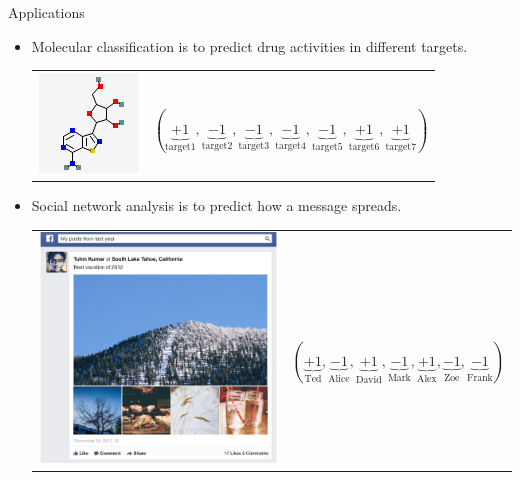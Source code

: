 \documentclass[first=purple,second=dgreen,logo=redexc]{aaltoslides}
\begin{document}
{\begin{frame}{Applications}
\begin{itemize}
\begin{tabular}{p{3cm}p{10cm}}
		& $(\underbrace{+1}_{\text{news}},\underbrace{+1}_{\text{economics}},\underbrace{-1}_{\text{sports}},\underbrace{-1}_{\text{politics}},\underbrace{-1}_{\text{movie}},\underbrace{-1}_{\text{science}},\underbrace{-1}_{\text{art}})$\\
        \end{tabular}
		\item Molecular classification is to predict drug activities in different targets.\\
		\begin{tabular}{p{3cm}p{10cm}} 
        \multirow{2}{*}{\includegraphics[scale = 0.4]{./figures/mol1.png}} & \\
		& $(\underbrace{+1}_{\text{target1}},\underbrace{-1}_{\text{target2}},\underbrace{-1}_{\text{target3}},\underbrace{-1}_{\text{target4}},\underbrace{-1}_{\text{target5}},\underbrace{+1}_{\text{target6}},\underbrace{+1}_{\text{target7}})$\\
        \end{tabular}
		\item Social network analysis is to predict how a message spreads.
		\begin{tabular}{p{3cm}p{10cm}} 
        \multirow{2}{*}{\includegraphics[scale = 0.07]{./figures/facebookvideo.png}} & \\
		& $(\underbrace{+1}_{\text{Ted}},\underbrace{-1}_{\text{Alice}},\underbrace{+1}_{\text{David}},\underbrace{-1}_{\text{Mark}},\underbrace{+1}_{\text{Alex}},\underbrace{-1}_{\text{Zoe}},\underbrace{-1}_{\text{Frank}})$\\
        \end{tabular}
	\end{itemize}
\end{frame}


}
\end{document}
